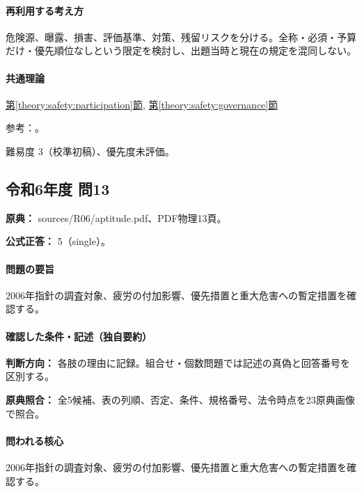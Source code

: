 \paragraph{再利用する考え方} 危険源、曝露、損害、評価基準、対策、残留リスクを分ける。全称・必須・予算だけ・優先順位なしという限定を検討し、出題当時と現在の規定を混同しない。

\paragraph{共通理論} \hyperref[theory:safety:participation]{第\ref*{theory:safety:participation}節}, \hyperref[theory:safety:governance]{第\ref*{theory:safety:governance}節}

\par 参考：\cite{saf_ra_effects,saf_ra2006,saf_chem2016}。

\par 難易度 3（校準初稿）、優先度未評価。

\subsection{令和6年度 問13}
\label{q:r06-reg-apt-13}

\noindent\textbf{原典：} sources/R06/aptitude.pdf、PDF物理13頁。

\textbf{公式正答：} 5（single）。

\paragraph{問題の要旨} 2006年指針の調査対象、疲労の付加影響、優先措置と重大危害への暫定措置を確認する。

\paragraph{確認した条件・記述（独自要約）}\mbox{}\par

\noindent\textbf{判断方向：} 各肢の理由に記録。組合せ・個数問題では記述の真偽と回答番号を区別する。\par

\noindent\textbf{原典照合：} 全5候補、表の列順、否定、条件、規格番号、法令時点を23原典画像で照合。\par

\paragraph{問われる核心} 2006年指針の調査対象、疲労の付加影響、優先措置と重大危害への暫定措置を確認する。

